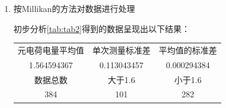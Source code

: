 \documentclass[dvipsnames, svgnames,a4paper,11pt]{article}
\begin{document}
	\begin{enumerate}
		\item 按Millikan的方法对数据进行处理
		
		初步分析\cref{tab:tab2}得到的数据呈现出以下结果：	
		\begin{center}
			\begin{tabular}{|c|c|c|}
				\hline
				元电荷电量平均值 & 单次测量标准差 & 平均值的标准差\\
				1.564594367 & 0.113043457 & 0.000294384\\
				\hline
				数据总数 & 大于1.6 & 小于1.6\\
				384 & 101 & 282 \\
				\hline
			\end{tabular}
		\end{center}
		

\end{enumerate}
\end{document}
